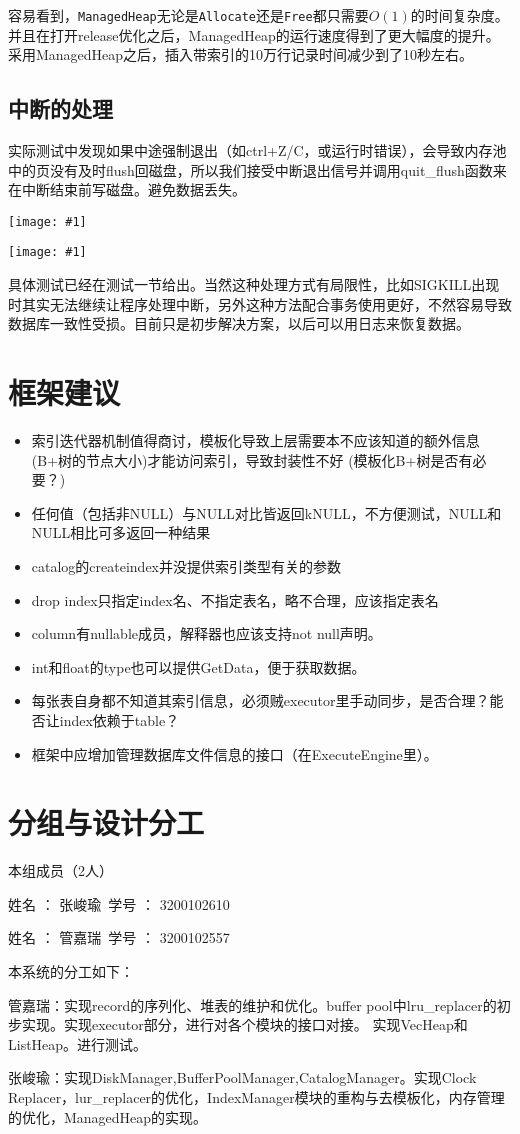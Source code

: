 \documentclass[12pt, a4paper]{article}
\def\c#1{\texttt{#1}}
\def\s#1{\section{#1}}
\def\ss#1{\subsection{#1}}
\def\p{\par}
\def\g#1{\begin{center}\texttt{[image: \#1]}\end{center}}
\def\gm#1{\begin{center}\texttt{[image: \#1]}\end{center}}
\begin{document}
\p 容易看到，\c{ManagedHeap}无论是\c{Allocate}还是\c{Free}都只需要$O(1)$的时间复杂度。并且在打开release优化之后，ManagedHeap的运行速度得到了更大幅度的提升。采用ManagedHeap之后，插入带索引的10万行记录时间减少到了10秒左右。
\ss{中断的处理}
\p 实际测试中发现如果中途强制退出（如ctrl+Z/C，或运行时错误），会导致内存池中的页没有及时flush回磁盘，所以我们接受中断退出信号并调用quit\_flush函数来在中断结束前写磁盘。避免数据丢失。
\g{imgs/sig_1.png}
\gm{imgs/sig_2.png}
\p 具体测试已经在测试一节给出。当然这种处理方式有局限性，比如SIGKILL出现时其实无法继续让程序处理中断，另外这种方法配合事务使用更好，不然容易导致数据库一致性受损。目前只是初步解决方案，以后可以用日志来恢复数据。
\s{框架建议}
\begin{itemize}
  \item 索引迭代器机制值得商讨，模板化导致上层需要本不应该知道的额外信息(B+树的节点大小)才能访问索引，导致封装性不好 (模板化B+树是否有必要？)
  \item 任何值（包括非NULL）与NULL对比皆返回kNULL，不方便测试，NULL和NULL相比可多返回一种结果
  \item catalog的createindex并没提供索引类型有关的参数
  \item drop index只指定index名、不指定表名，略不合理，应该指定表名
  \item column有nullable成员，解释器也应该支持not null声明。
  \item int和float的type也可以提供GetData，便于获取数据。
  \item 每张表自身都不知道其索引信息，必须贼executor里手动同步，是否合理？能否让index依赖于table？
  \item 框架中应增加管理数据库文件信息的接口（在ExecuteEngine里）。
\end{itemize}
\s{分组与设计分工}
\p 本组成员（2人）
\p 姓名 ： 张峻瑜\ 学号 ： 3200102610
\p 姓名 ： 管嘉瑞\ 学号 ： 3200102557
\\
\p 本系统的分工如下：
\p 管嘉瑞：实现record的序列化、堆表的维护和优化。buffer pool中lru\_replacer的初步实现。实现executor部分，进行对各个模块的接口对接。 实现VecHeap和ListHeap。进行测试。
\p 张峻瑜：实现DiskManager,BufferPoolManager,CatalogManager。实现Clock Replacer，lur\_replacer的优化，IndexManager模块的重构与去模板化，内存管理的优化，ManagedHeap的实现。
\end{document}
